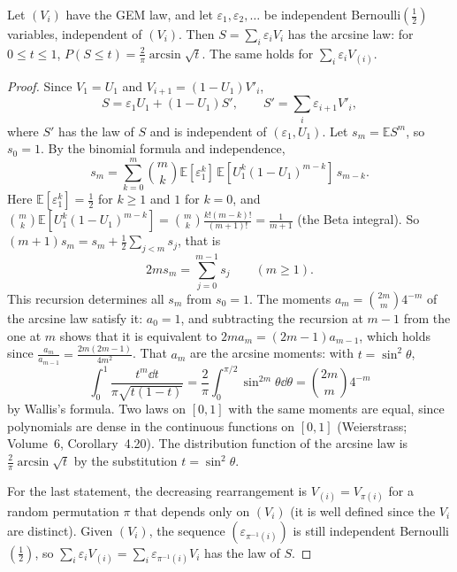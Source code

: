 \begin{lemma}\label{lem:gemarcsine}
Let $(V_i)$ have the GEM law, and let $\varepsilon_1,\varepsilon_2,\dots$ be independent Bernoulli$(\frac12)$ variables, independent of $(V_i)$. Then $S=\sum_i\varepsilon_iV_i$ has the arcsine law: for $0\le t\le1$, $P(S\le t)=\frac2\pi\arcsin\sqrt t$. The same holds for $\sum_i\varepsilon_iV_{(i)}$.
\end{lemma}
\begin{proof}
Since $V_1=U_1$ and $V_{i+1}=(1-U_1)V'_i$,
\[
S=\varepsilon_1U_1+(1-U_1)S',\qquad S'=\sum_i\varepsilon_{i+1}V'_i,
\]
where $S'$ has the law of $S$ and is independent of $(\varepsilon_1,U_1)$. Let $s_m=\mathbb ES^m$, so $s_0=1$. By the binomial formula and independence,
\[
s_m=\sum_{k=0}^m\binom mk\mathbb E[\varepsilon_1^k]\,\mathbb E[U_1^k(1-U_1)^{m-k}]\,s_{m-k}.
\]
Here $\mathbb E[\varepsilon_1^k]=\frac12$ for $k\ge1$ and $1$ for $k=0$, and $\binom mk\mathbb E[U_1^k(1-U_1)^{m-k}]=\binom mk\frac{k!(m-k)!}{(m+1)!}=\frac1{m+1}$ (the Beta integral). So $(m+1)s_m=s_m+\frac12\sum_{j<m}s_j$, that is
\[
2ms_m=\sum_{j=0}^{m-1}s_j\qquad(m\ge1).
\]
This recursion determines all $s_m$ from $s_0=1$. The moments $a_m=\binom{2m}m4^{-m}$ of the arcsine law satisfy it: $a_0=1$, and subtracting the recursion at $m-1$ from the one at $m$ shows that it is equivalent to $2ma_m=(2m-1)a_{m-1}$, which holds since $\frac{a_m}{a_{m-1}}=\frac{2m(2m-1)}{4m^2}$. That $a_m$ are the arcsine moments: with $t=\sin^2\theta$,
\[
\int_0^1\frac{t^m\dd t}{\pi\sqrt{t(1-t)}}=\frac2\pi\int_0^{\pi/2}\sin^{2m}\theta\dd\theta=\binom{2m}m4^{-m}
\]
by Wallis's formula. Two laws on $[0,1]$ with the same moments are equal, since polynomials are dense in the continuous functions on $[0,1]$ (Weierstrass; Volume~6, Corollary~4.20). The distribution function of the arcsine law is $\frac2\pi\arcsin\sqrt t$ by the substitution $t=\sin^2\theta$.

For the last statement, the decreasing rearrangement is $V_{(i)}=V_{\pi(i)}$ for a random permutation $\pi$ that depends only on $(V_i)$ (it is well defined since the $V_i$ are distinct). Given $(V_i)$, the sequence $(\varepsilon_{\pi^{-1}(i)})$ is still independent Bernoulli$(\frac12)$, so $\sum_i\varepsilon_iV_{(i)}=\sum_i\varepsilon_{\pi^{-1}(i)}V_i$ has the law of $S$.
\end{proof}

